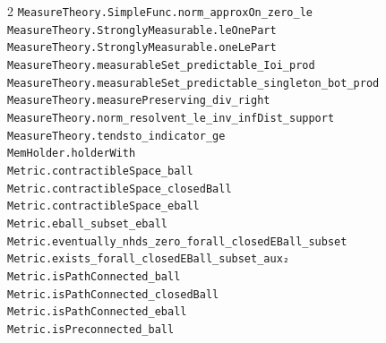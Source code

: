 \documentclass[10pt,a4paper]{article}
\begin{document}
\begin{multicols}{2}
\texttt{MeasureTheory.\allowbreak{}SimpleFunc.\allowbreak{}norm\_approxOn\_zero\_le} \\
\texttt{MeasureTheory.\allowbreak{}StronglyMeasurable.\allowbreak{}leOnePart} \\
\texttt{MeasureTheory.\allowbreak{}StronglyMeasurable.\allowbreak{}oneLePart} \\
\texttt{MeasureTheory.\allowbreak{}measurableSet\_predictable\_Ioi\_prod} \\
\texttt{MeasureTheory.\allowbreak{}measurableSet\_predictable\_singleton\_bot\_prod} \\
\texttt{MeasureTheory.\allowbreak{}measurePreserving\_div\_right} \\
\texttt{MeasureTheory.\allowbreak{}norm\_resolvent\_le\_inv\_infDist\_support} \\
\texttt{MeasureTheory.\allowbreak{}tendsto\_indicator\_ge} \\
\texttt{MemHolder.\allowbreak{}holderWith} \\
\texttt{Metric.\allowbreak{}contractibleSpace\_ball} \\
\texttt{Metric.\allowbreak{}contractibleSpace\_closedBall} \\
\texttt{Metric.\allowbreak{}contractibleSpace\_eball} \\
\texttt{Metric.\allowbreak{}eball\_subset\_eball} \\
\texttt{Metric.\allowbreak{}eventually\_nhds\_zero\_forall\_closedEBall\_subset} \\
\texttt{Metric.\allowbreak{}exists\_forall\_closedEBall\_subset\_aux₂} \\
\texttt{Metric.\allowbreak{}isPathConnected\_ball} \\
\texttt{Metric.\allowbreak{}isPathConnected\_closedBall} \\
\texttt{Metric.\allowbreak{}isPathConnected\_eball} \\
\texttt{Metric.\allowbreak{}isPreconnected\_ball} \\

\end{multicols}
\end{document}
